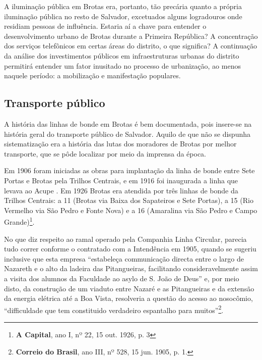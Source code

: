 A iluminação pública em Brotas era, portanto, tão precária quanto a própria iluminação pública no resto de Salvador, excetuados alguns logradouros onde residiam pessoas de influência. Estaria aí a chave para entender o desenvolvimento urbano de Brotas durante a Primeira República? A concentração dos serviços telefônicos em certas áreas do distrito, o que significa? A continuação da análise dos investimentos públicos em infraestruturas urbanas do distrito permitirá entender um fator inusitado no processo de urbanização, ao menos naquele período: a mobilização e manifestação populares.

\subsection{Transporte público}\label{subsec:transpub}

A história das linhas de bonde em Brotas é bem documentada, pois insere-se na história geral do transporte público de Salvador. Aquilo de que não se dispunha sistematização era a história das lutas dos moradores de Brotas por melhor transporte, que se pôde localizar por meio da imprensa da época.

Em 1906 foram iniciadas as obras para implantação da linha de bonde entre Sete Portas e Brotas pela Trilhos Centrais, e em 1916 foi inaugurada a linha que levava ao Acupe \cite[p.~299]{VASCONCELOS2002}. Em 1926 Brotas era atendida por três linhas de bonde da Trilhos Centrais: a 11 (Brotas via Baixa dos Sapateiros e Sete Portas), a 15 (Rio Vermelho via São Pedro e Fonte Nova) e a 16 (Amaralina via São Pedro e Campo Grande)\footnote{\textbf{A Capital}, ano I, nº 22, 15 out. 1926, p. 3}.

No que diz respeito ao ramal operado pela Companhia Linha Circular, parecia tudo correr conforme o contratado com a Intendência em 1905, quando se sugeriu inclusive que esta empresa ``estabeleça communicação directa entre o largo de Nazareth e o alto da ladeira das Pitangueiras, facilitando consideravelmente assim a visita dos alumnos da Faculdade ao asylo de S. João de Deus'' e, por meio disto, da construção de um viaduto entre Nazaré e as Pitangueiras e da extensão da energia elétrica até a Boa Vista, resolveria a questão do acesso ao nosocômio, ``difficuldade que tem constituido verdadeiro espantalho para muitos''\footnote{\textbf{Correio do Brasil}, ano III, nº 528, 15 jun. 1905, p. 1.}. 

